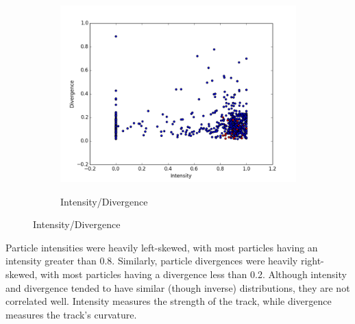 \documentclass[notitlepage]{article}
\begin{document}
\begin{figure}[h!]
\begin{subfigure}{.3\textwidth}
  \includegraphics[width=\textwidth]{scatterid}
  \label{fig:scatterid}
  \caption{Intensity/Divergence}
\end{subfigure}
\label{fig:test}
\end{figure}

Particle intensities were heavily left-skewed, with most particles having an intensity greater than 0.8.  Similarly, particle divergences were heavily right-skewed, with most particles having a divergence less than 0.2.  Although intensity and divergence tended to have similar (though inverse) distributions, they are not correlated well.  Intensity measures the strength of the track, while divergence measures the track's curvature.
\end{document}
